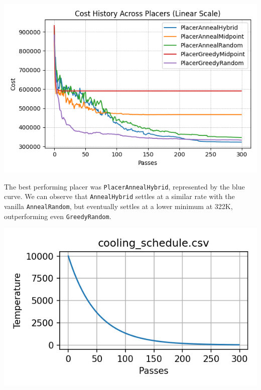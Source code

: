 {
    \centering
    \includegraphics[width=\columnwidth]{figures/results/combined_cost_history_linear.png}
    \label{fig:placers_overlay}
}

The best performing placer was \texttt{PlacerAnnealHybrid}, represented by the blue curve.
We can observe that \texttt{AnnealHybrid} settles at a similar rate with the vanilla \texttt{AnnealRandom}, but eventually settles at a lower minimum at 322K, outperforming even \texttt{GreedyRandom}. 

{
    \centering
    \includegraphics[width=0.7\columnwidth]{figures/placement/cooling_schedule_10000_98.png}
    \label{fig:cooling_schedule_10000_98}
}

